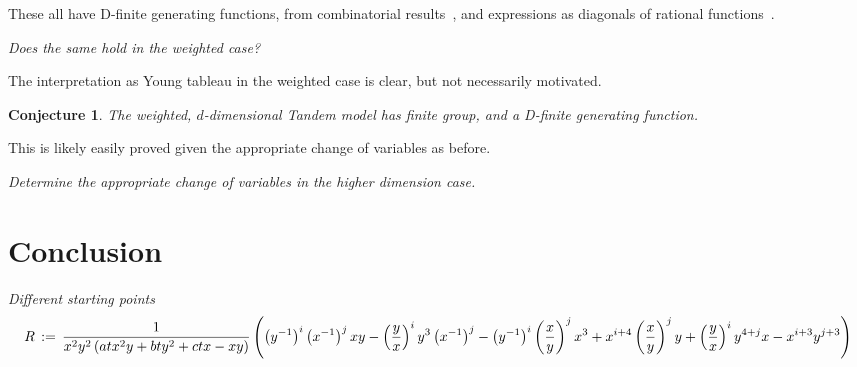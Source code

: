 \documentclass[11pt]{article}
\newtheorem{conjecture}[que]{Conjecture}
\newcommand\mjm[1]{\mbox{}
{\marginpar{\color{red!50}$\EuScript{M}$}}
{\it\noindent\color{red!50}#1}}%
\begin{document}
These all have D-finite generating functions, from combinatorial
results~\cite{Gessel90}, and expressions as diagonals of rational
functions~\cite{Buetal16}. 

{\it Does the same hold in the weighted case?}

The interpretation as Young tableau in the weighted case is clear, 
but not necessarily motivated. 
\begin{conjecture}
The weighted, $d$-dimensional Tandem model has finite group, 
and a D-finite generating function. 
\end{conjecture}
This is likely easily proved given the appropriate change of
variables as before. 

\mjm{Determine the appropriate change of variables in the higher
  dimension case.}


\section{Conclusion}
\mjm{Different starting points}
{\tiny
\[\displaystyle R\, := \,{\frac {1}{{x}^{2}{y}^{2} \left( at{x}^{2}y+bt{y}^{2}+ctx-xy \right) } \left(  \left( {y}^{-1} \right) ^{i} \left( {x}^{-1} \right) ^{j}xy- \left( {\frac {y}{x}} \right) ^{i}{y}^{3} \left( {x}^{-1} \right) ^{j}- \left( {y}^{-1} \right) ^{i} \left( {\frac {x}{y}} \right) ^{j}{x}^{3}\\
\mbox{}+{x}^{i+4} \left( {\frac {x}{y}} \right) ^{j}y+ \left( {\frac
    {y}{x}} \right) ^{i}{y}^{4+j}x-{x}^{i+3}{y}^{j+3} \right) }\]}


\end{document}
